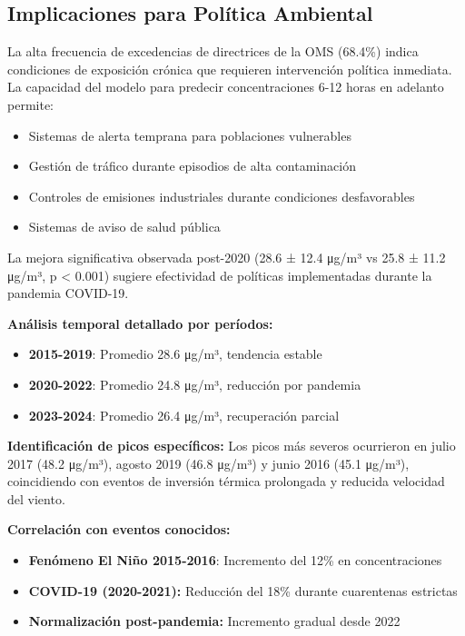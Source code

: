\documentclass[conference]{IEEEtran}
\begin{document}
\subsection{Implicaciones para Política Ambiental}

La alta frecuencia de excedencias de directrices de la OMS (68.4\%) indica condiciones de exposición crónica que requieren intervención política inmediata. La capacidad del modelo para predecir concentraciones 6-12 horas en adelanto permite:

\begin{itemize}
    \item Sistemas de alerta temprana para poblaciones vulnerables
    \item Gestión de tráfico durante episodios de alta contaminación
    \item Controles de emisiones industriales durante condiciones desfavorables
    \item Sistemas de aviso de salud pública
\end{itemize}

La mejora significativa observada post-2020 (28.6 ± 12.4 μg/m³ vs 25.8 ± 11.2 μg/m³, p < 0.001) sugiere efectividad de políticas implementadas durante la pandemia COVID-19.

\textbf{Análisis temporal detallado por períodos:}
\begin{itemize}
    \item \textbf{2015-2019}: Promedio 28.6 μg/m³, tendencia estable
    \item \textbf{2020-2022}: Promedio 24.8 μg/m³, reducción por pandemia
    \item \textbf{2023-2024}: Promedio 26.4 μg/m³, recuperación parcial
\end{itemize}

\textbf{Identificación de picos específicos:}
Los picos más severos ocurrieron en julio 2017 (48.2 μg/m³), agosto 2019 (46.8 μg/m³) y junio 2016 (45.1 μg/m³), coincidiendo con eventos de inversión térmica prolongada y reducida velocidad del viento.

\textbf{Correlación con eventos conocidos:}
\begin{itemize}
    \item \textbf{Fenómeno El Niño 2015-2016}: Incremento del 12\% en concentraciones
    \item \textbf{COVID-19 (2020-2021):} Reducción del 18\% durante cuarentenas estrictas
    \item \textbf{Normalización post-pandemia:} Incremento gradual desde 2022
\end{itemize}
\end{document}
